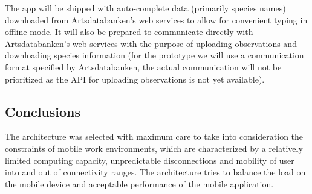 The app will be shipped with auto-complete data (primarily species names)
downloaded from Artsdatabanken's web services to allow for convenient typing in
offline mode. It will also be prepared to communicate directly with
Artsdatabanken's web services with the purpose of uploading observations and
downloading species information (for the prototype we will use a communication
format specified by Artsdatabanken, the actual communication will not be
prioritized as the API for uploading observations is not yet available).

\subsection{Conclusions}
The architecture was selected with maximum care to take into consideration the constraints of mobile work environments, which are characterized by a relatively limited computing capacity, unpredictable disconnections and mobility of user into and out of connectivity ranges. The architecture tries to balance the load on the mobile device and acceptable performance of the mobile application.
